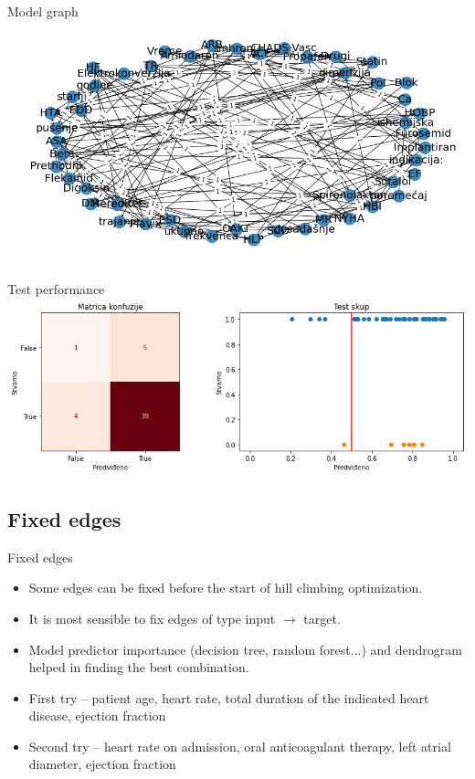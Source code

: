 \documentclass[hyperref={bookmarks=false}]{beamer}
\begin{document}
\begin{frame}{Model graph}
\includegraphics[width=\textwidth]{../slike/learn1.png}
\end{frame}

\begin{frame}{Test performance}
\includegraphics[width=\textwidth]{../slike/learn2.png}
\end{frame}

\subsection{Fixed edges}
\begin{frame}{Fixed edges}
\begin{itemize}
    \item Some edges can be fixed before the start of hill climbing optimization.
    \item It is most sensible to fix edges of type input $\rightarrow$ target.
    \item Model predictor importance (decision tree, random forest...) and dendrogram helped in finding the best combination.
    \item First try -- patient age, heart rate, total duration of the indicated heart disease, ejection fraction
    \item Second try -- heart rate on admission, oral anticoagulant therapy, left atrial diameter, ejection fraction
\end{itemize}
\end{frame}
\end{document}
